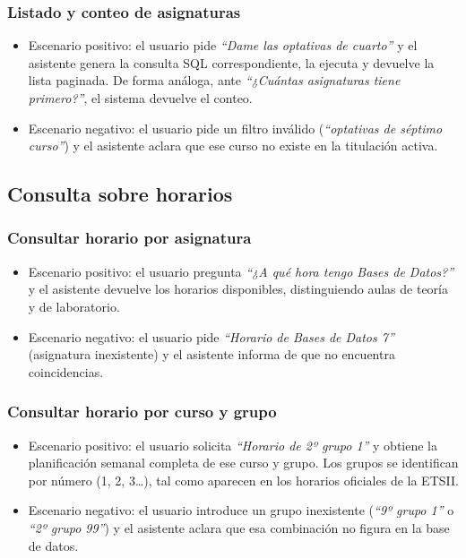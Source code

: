 \subsubsection{Listado y conteo de asignaturas}

\begin{itemize}
    \item Escenario positivo: el usuario pide \textit{``Dame las optativas de cuarto''} y el asistente genera la consulta SQL correspondiente, la ejecuta y devuelve la lista paginada. De forma análoga, ante \textit{``¿Cuántas asignaturas tiene primero?''}, el sistema devuelve el conteo.
    \item Escenario negativo: el usuario pide un filtro inválido (\textit{``optativas de séptimo curso''}) y el asistente aclara que ese curso no existe en la titulación activa.
\end{itemize}

\subsection{Consulta sobre horarios}

\subsubsection{Consultar horario por asignatura}

\begin{itemize}
    \item Escenario positivo: el usuario pregunta \textit{``¿A qué hora tengo Bases de Datos?''} y el asistente devuelve los horarios disponibles, distinguiendo aulas de teoría y de laboratorio.
    \item Escenario negativo: el usuario pide \textit{``Horario de Bases de Datos 7''} (asignatura inexistente) y el asistente informa de que no encuentra coincidencias.
\end{itemize}

\subsubsection{Consultar horario por curso y grupo}

\begin{itemize}
    \item Escenario positivo: el usuario solicita \textit{``Horario de 2º grupo 1''} y obtiene la planificación semanal completa de ese curso y grupo. Los grupos se identifican por número (1, 2, 3\ldots), tal como aparecen en los horarios oficiales de la ETSII.
    \item Escenario negativo: el usuario introduce un grupo inexistente (\textit{``9º grupo 1''} o \textit{``2º grupo 99''}) y el asistente aclara que esa combinación no figura en la base de datos.
\end{itemize}

